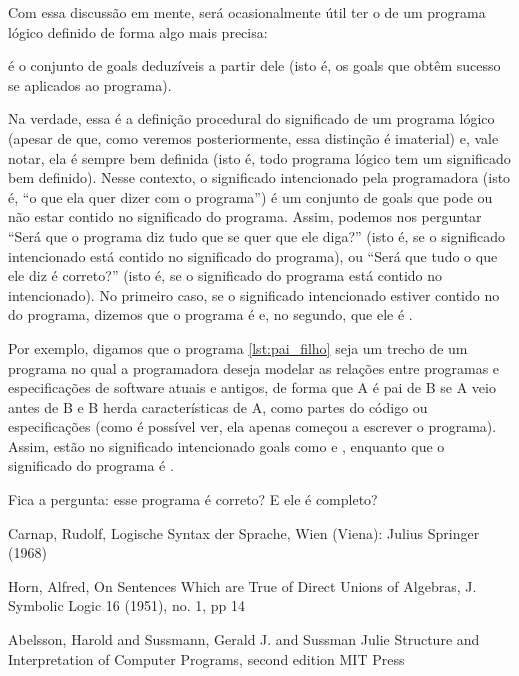 \documentclass{article}
\begin{document}
Com essa discussão em mente, será ocasionalmente útil ter o
 de um programa lógico definido de forma algo
mais precisa:

\theoremstyle{definition}
\begin{definition}  é o
  conjunto de goals deduzíveis a partir dele (isto é, os goals que
  obtêm sucesso se aplicados ao programa).
\end{definition}

  Na verdade, essa é a definição procedural do significado de um
programa lógico (apesar de que, como veremos posteriormente, essa
distinção é imaterial) e, vale notar, ela é sempre bem definida (isto
é, todo programa lógico tem um significado bem definido). Nesse
contexto, o significado intencionado pela programadora (isto é, ``o
que ela quer dizer com o programa'') é um conjunto de goals que pode
ou não estar contido no significado do programa. Assim, podemos nos
perguntar ``Será que o programa diz tudo que se quer que ele diga?''
(isto é, se o significado intencionado está contido no significado do
programa), ou ``Será que tudo o que ele diz é correto?'' (isto é, se o
significado do programa está contido no intencionado). No primeiro
caso, se o significado intencionado estiver contido no do programa,
dizemos que o programa é  e, no segundo, que ele é
.

  Por exemplo, digamos que o programa \ref{lst:pai_filho} seja um
trecho de um programa no qual a programadora deseja modelar as
relações entre programas e especificações de software atuais e
antigos, de forma que A é pai de B se A veio antes de B e B herda
características de A, como partes do código ou especificações (como é
possível ver, ela apenas começou a escrever o programa). Assim, estão
no significado intencionado goals como  e
, enquanto que o significado do programa é
.

  Fica a pergunta: esse programa é correto? E ele é completo?


  \begin{thebibliography}{1}

   Carnap, Rudolf, Logische Syntax der Sprache, Wien
    (Viena): Julius Springer (1968)

   Horn, Alfred, On Sentences Which are True of
    Direct Unions of Algebras, J. Symbolic Logic 16 (1951), no. 1, pp 14

   Abelsson, Harold and Sussmann, Gerald J. and
    Sussman Julie Structure and Interpretation of Computer Programs,
    second edition MIT Press

  \end{thebibliography}
\end{document}
